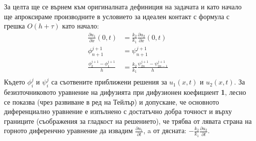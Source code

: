 За целта ще се върнем към оригиналната дефиниция на задачата и като начало ще апроксираме производните в условието за идеален контакт с формула с  грешка $O(h+\tau)$ като начало:
\begin{align*}
    \frac{\partial u_1}{\partial x} (0, t) &= \frac{k_2}{k_1} \frac{\partial u_2}{\partial x} (0, t) \\
    \phi_{n+1}^{j+1} &= \psi_{n+1}^{j+1} \\
    \frac{\phi_{2}^{j+1} - \phi_{1}^{j+1}}{h} &=  \frac{k_2}{k_1} \frac{\psi_{2n}^{j+1} - \psi_{2n-1}^{j+1}}{h} \\
\end{align*}
Където $\phi_i^j$ и $\psi_i^j$ са съотвените приближени решения за $u_1(x,t)$ и $u_2(x,t)$.
За безизточниковото уравнение на дифузията при дифузионен коефициент \textbf{1}, лесно се показва (чрез развиване в ред на Тейлър) и допускане, че основното диференциално уравнение
е изпълнено с достатъчно добра точност и върху границите (съображения за гладкост на решението), че трябва от лявата страна на горното диференчно уравнение да извадим $\frac{\partial u_1}{\partial t}$, a от дясната: $-\frac{k_2}{k_1}\frac{\partial u_2}{\partial t}$.
